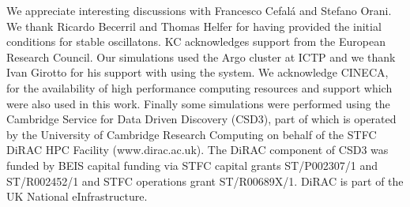 \documentclass[11pt,a4paper]{article}
\begin{document}
We appreciate interesting discussions with Francesco Cefal\'a and Stefano Orani. We thank Ricardo Becerril and Thomas Helfer for having provided the initial conditions for stable oscillatons. KC acknowledges support from the European Research Council. Our simulations used the Argo cluster at ICTP and we thank Ivan Girotto for his support with using the system. We acknowledge CINECA, for the availability of high performance computing resources and support which were also used in this work. Finally some simulations were performed using the Cambridge Service for Data Driven Discovery (CSD3), part of which is operated by the University of Cambridge Research Computing on behalf of the STFC DiRAC HPC Facility (www.dirac.ac.uk). The DiRAC component of CSD3 was funded by BEIS capital funding via STFC capital grants ST/P002307/1 and ST/R002452/1 and STFC operations grant ST/R00689X/1. DiRAC is part of the UK National eInfrastructure.
\end{document}
